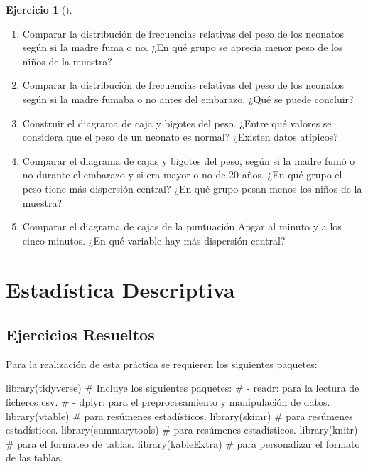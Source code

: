 \documentclass[
  a4paper,
]{scrreport}
\newenvironment{Shaded}{\begin{snugshade}}{\end{snugshade}}
\newcommand{\CommentTok}[1]{\textcolor[rgb]{0.37,0.37,0.37}{#1}}
\newcommand{\FunctionTok}[1]{\textcolor[rgb]{0.28,0.35,0.67}{#1}}
\newcommand{\NormalTok}[1]{\textcolor[rgb]{0.00,0.23,0.31}{#1}}
\theoremstyle{definition}
\newtheorem{exercise}{Ejercicio}[chapter]
\theoremstyle{remark}
\begin{document}
\begin{exercise}[]
\begin{enumerate}
\item
  Comparar la distribución de frecuencias relativas del peso de los
  neonatos según si la madre fuma o no. ¿En qué grupo se aprecia menor
  peso de los niños de la muestra?
\item
  Comparar la distribución de frecuencias relativas del peso de los
  neonatos según si la madre fumaba o no antes del embarazo. ¿Qué se
  puede concluir?
\item
  Construir el diagrama de caja y bigotes del peso. ¿Entre qué valores
  se considera que el peso de un neonato es normal? ¿Existen datos
  atípicos?
\item
  Comparar el diagrama de cajas y bigotes del peso, según si la madre
  fumó o no durante el embarazo y si era mayor o no de 20 años. ¿En qué
  grupo el peso tiene más dispersión central? ¿En qué grupo pesan menos
  los niños de la muestra?
\item
  Comparar el diagrama de cajas de la puntuación Apgar al minuto y a los
  cinco minutos. ¿En qué variable hay más dispersión central?
\end{enumerate}

\end{exercise}


\chapter{Estadística Descriptiva}\label{estaduxedstica-descriptiva}

\section{Ejercicios Resueltos}\label{ejercicios-resueltos-3}

Para la realización de esta práctica se requieren los siguientes
paquetes:

\begin{Shaded}
\begin{Highlighting}[]
\FunctionTok{library}\NormalTok{(tidyverse) }
\CommentTok{\# Incluye los siguientes paquetes:}
\CommentTok{\# {-} readr: para la lectura de ficheros csv. }
\CommentTok{\# {-} dplyr: para el preprocesamiento y manipulación de datos.}
\FunctionTok{library}\NormalTok{(vtable) }\CommentTok{\# para resúmenes estadísticos.}
\FunctionTok{library}\NormalTok{(skimr) }\CommentTok{\# para resúmenes estadísticos.}
\FunctionTok{library}\NormalTok{(summarytools) }\CommentTok{\# para resúmenes estadísticos.}
\FunctionTok{library}\NormalTok{(knitr) }\CommentTok{\# para el formateo de tablas.}
\FunctionTok{library}\NormalTok{(kableExtra) }\CommentTok{\# para personalizar el formato de las tablas.}
\end{Highlighting}
\end{Shaded}
\end{document}
